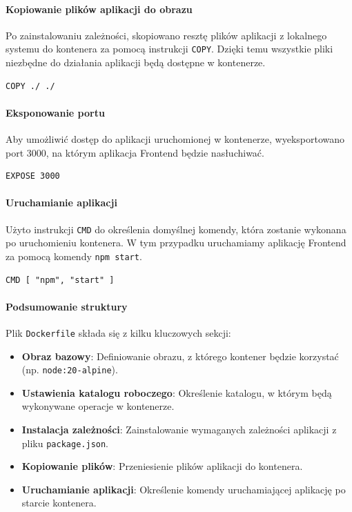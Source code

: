 \paragraph{Kopiowanie plików aplikacji do obrazu}
Po zainstalowaniu zależności, skopiowano resztę plików aplikacji z lokalnego systemu do kontenera za pomocą instrukcji \texttt{COPY}. Dzięki temu wszystkie pliki niezbędne do działania aplikacji będą dostępne w kontenerze.
\begin{lstlisting}
COPY ./ ./
\end{lstlisting}

\paragraph{Eksponowanie portu}
Aby umożliwić dostęp do aplikacji uruchomionej w kontenerze, wyeksportowano port 3000, na którym aplikacja Frontend będzie nasłuchiwać.
\begin{lstlisting}
EXPOSE 3000
\end{lstlisting}

\paragraph{Uruchamianie aplikacji}
Użyto instrukcji \texttt{CMD} do określenia domyślnej komendy, która zostanie wykonana po uruchomieniu kontenera. W tym przypadku uruchamiamy aplikację Frontend za pomocą komendy \texttt{npm start}.
\begin{lstlisting}
CMD [ "npm", "start" ]
\end{lstlisting}

\paragraph{Podsumowanie struktury}
Plik \texttt{Dockerfile} składa się z kilku kluczowych sekcji:
\begin{itemize}
    \item \textbf{Obraz bazowy}: Definiowanie obrazu, z którego kontener będzie korzystać (np. \texttt{node:20-alpine}).
    \item \textbf{Ustawienia katalogu roboczego}: Określenie katalogu, w którym będą wykonywane operacje w kontenerze.
    \item \textbf{Instalacja zależności}: Zainstalowanie wymaganych zależności aplikacji z pliku \texttt{package.json}.
    \item \textbf{Kopiowanie plików}: Przeniesienie plików aplikacji do kontenera.
    \item \textbf{Uruchamianie aplikacji}: Określenie komendy uruchamiającej aplikację po starcie kontenera.
\end{itemize}

